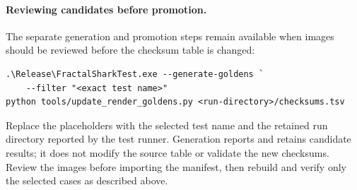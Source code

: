 \paragraph{Reviewing candidates before promotion.}
The separate generation and promotion steps remain available when images
should be reviewed before the checksum table is changed:

\begin{lstlisting}[language={},upquote=true]
.\Release\FractalSharkTest.exe --generate-goldens `
    --filter "<exact test name>"
python tools/update_render_goldens.py <run-directory>/checksums.tsv
\end{lstlisting}

Replace the placeholders with the selected test name and the retained run
directory reported by the test runner. Generation reports 
and retains candidate results; it does not modify the source table or validate
the new checksums. Review the images before importing the manifest, then
rebuild and verify only the selected cases as described above.
